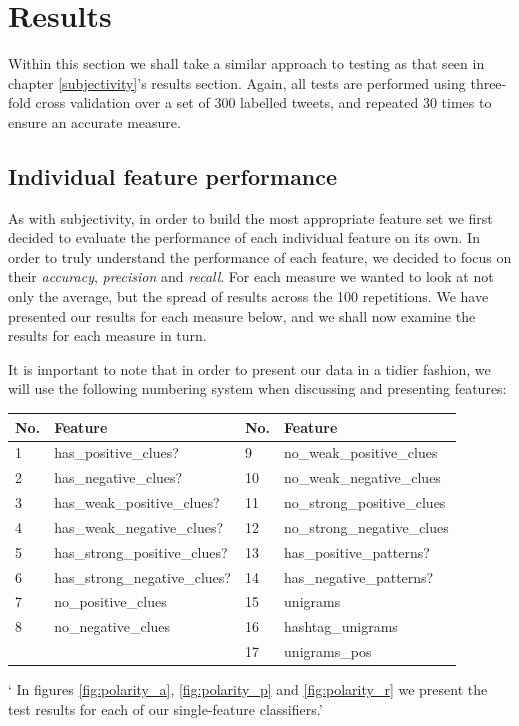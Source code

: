\section{Results}

Within this section we shall take a similar approach to testing as that seen in chapter \ref{subjectivity}'s results section. Again, all tests are performed using three-fold cross validation over a set of 300 labelled tweets, and repeated 30 times to ensure an accurate measure.

\subsection{Individual feature performance}

As with subjectivity, in order to build the most appropriate feature set we first decided to evaluate the performance of each individual feature on its own. In order to truly understand the performance of each feature, we decided to focus on their \emph{accuracy}, \emph{precision} and \emph{recall}. For each measure we wanted to look at not only the average, but the spread of results across the 100 repetitions. We have presented our results for each measure below, and we shall now examine the results for each measure in turn.

It is important to note that in order to present our data in a tidier fashion, we will use the following numbering system when discussing and presenting features:

\begin{longtable}{|p{0.25in}|p{1.55in}|p{0.25in}|p{1.55in}|}
	
		\hline
		No. & Feature & No. & Feature \\
		\hline
		1 & has\-\_positive\-\_clues? & 9 & no\-\_weak\-\_positive\-\_clues \\
		\hline
    2 & has\-\_negative\-\_clues? & 10 & no\-\_weak\-\_negative\-\_clues \\
		\hline
    3 & has\-\_weak\-\_positive\-\_clues? & 11 & no\-\_strong\-\_positive\-\_clues \\
		\hline
    4 & has\-\_weak\-\_negative\-\_clues? & 12	& no\-\_strong\-\_negative\-\_clues \\
		\hline
    5 & has\-\_strong\-\_positive\-\_clues? & 13	& has\-\_positive\-\_patterns? \\
		\hline
		6 & has\-\_strong\-\_negative\-\_clues? & 14	& has\-\_negative\-\_patterns? \\
		\hline
		7	& no\-\_positive\-\_clues & 15	& unigrams \\
		\hline
		8	& no\-\_negative\-\_clues & 16 & hashtag\-\_unigrams \\
		\hline
		& & 17 & unigrams\-\_pos \\
		\hline
\end{longtable}
`
In figures \ref{fig:polarity_a}, \ref{fig:polarity_p} and \ref{fig:polarity_r} we present the test results for each of our single-feature classifiers.'

